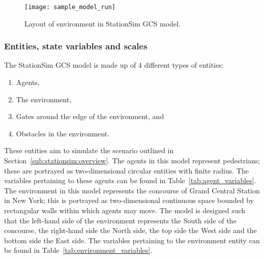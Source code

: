 \begin{figure}[h]
    \centering
    \texttt{[image: sample\_model\_run]}
    \caption{Layout of environment in StationSim GCS model.}
    \label{fig:stationsim_gcs_env}
\end{figure}

\subsubsection{Entities, state variables and
scales}\label{subs:stationsim:overview:entities}

The StationSim GCS model is made up of 4 different types of entities:
\begin{enumerate}
    \item Agents,
    \item The environment,
    \item Gates around the edge of the environment, and
    \item Obstacles in the environment.
\end{enumerate}
These entities aim to simulate the scenario outlined in
Section~\ref{sub:stationsim:overview}.
The agents in this model represent pedestrians; these are portrayed as
two-dimensional circular entities with finite radius.
The variables pertaining to these agents can be found in
Table~\ref{tab:agent_variables}.
The environment in this model represents the concourse of Grand Central Station
in New York; this is portrayed as two-dimensional continuous space bounded by
rectangular walls within which agents may move.
The model is designed such that the left-hand side of the environment
represents the South side of the concourse, the right-hand side the North side,
the top side the West side and the bottom side the East side.
The variables pertaining to the environment entity can be found in
Table~\ref{tab:environment_variables}.

